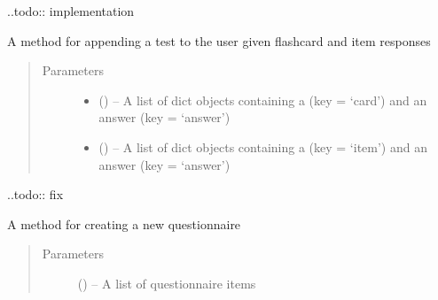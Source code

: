 \documentclass[letterpaper,10pt,english]{sphinxmanual}
\begin{document}
\begin{fulllineitems}
\begin{fulllineitems}
..todo:: implementation

\end{fulllineitems}


\begin{fulllineitems}
\label{\detokenize{user:user.User.append_test}}
A method for appending a test to the user given flashcard and item responses
\begin{quote}\begin{description}
\item[{Parameters}] \leavevmode\begin{itemize}
\item {} 
 (\href{https://docs.python.org/2/library/stdtypes.html\#dict}{}) -- A list of dict objects containing a  (key = `card') and an answer (key = `answer')

\item {} 
 (\href{https://docs.python.org/2/library/stdtypes.html\#dict}{}) -- A list of dict objects containing a  (key = `item') and an answer (key = `answer')

\end{itemize}

\end{description}\end{quote}

..todo:: fix

\end{fulllineitems}


\begin{fulllineitems}
\label{\detokenize{user:user.User.create_questionnaire}}
A method for creating a new questionnaire
\begin{quote}\begin{description}
\item[{Parameters}] \leavevmode
{} (\href{https://docs.python.org/2/library/functions.html\#list}{}\sphinxstyleliteralemphasis{)}\sphinxstyleliteralemphasis{}) -- A list of questionnaire items


\end{description}
\end{quote}
\end{fulllineitems}
\end{fulllineitems}
\end{document}

